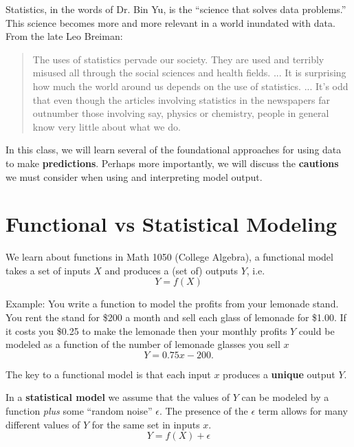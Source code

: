\documentclass[12pt]{../notes}
\begin{document}
Statistics, in the words of Dr. Bin Yu, is the ``science that solves data problems.'' This science becomes more and more relevant in a world inundated with data. From the late Leo Breiman:

\begin{quotation}
The uses of statistics pervade our society. They are used and terribly misused all through the social sciences and health fields. ... It is surprising how much the world around us depends on the use of statistics. ... It’s odd that even though the articles involving statistics in the newspapers far outnumber those involving say, physics or chemistry, people in general know very little about what we do.
\end{quotation}

In this class, we will learn several of the foundational approaches for using data to make \textbf{predictions}. Perhaps more importantly, we will discuss the \textbf{cautions} we must consider when using and interpreting model output. 


\begin{minipage}[l][3cm][c]{\textwidth}

\end{minipage}


\section{Functional vs Statistical Modeling}

We learn about functions in Math 1050 (College Algebra), a functional model takes a set of inputs $X$ and produces a (set of) outputs $Y$, i.e.
\[Y = f(X)\]

Example: 
You write a function to model the profits from your lemonade stand. You rent the stand for \$200 a month and sell each glass of lemonade for \$1.00. If it costs you \$0.25 to make the lemonade then your monthly profits $Y$ could be modeled as a function of the number of lemonade glasses you sell $x$
\[Y = 0.75x - 200.\] 

The key to a functional model is that each input $x$ produces a \textbf{unique} output $Y$.

\vspace{0.5cm}
In a \textbf{statistical model} we assume that the values of $Y$ can be modeled by a function \textit{plus} some ``random noise'' $\epsilon$. The presence of the $\epsilon$ term allows for many different values of $Y$ for the same set in inputs $x$. 
\[Y = f(X) + \epsilon\]
\end{document}
